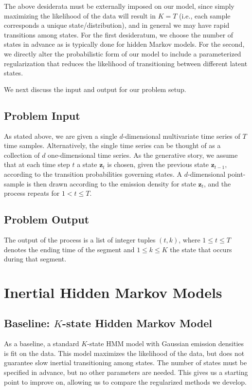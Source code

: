 \documentclass[12pt]{article}
\begin{document}
The above desiderata must be externally imposed on our model, since simply maximizing the likelihood of the data will result in $K = T$ (i.e., each sample corresponds a unique state/distribution), and in general we may have rapid transitions among states. For the first desideratum,  we choose the number of states in advance as is typically done for hidden Markov models. For the second, we directly alter the probabilistic form of our model to include a parameterized regularization that reduces the likelihood of transitioning between different latent states.

We next discuss the input and output for our problem setup.

\subsection{Problem Input}

As stated above, we are given a single $d$-dimensional multivariate time series of $T$ time samples. Alternatively, the single time series can be thought of as a collection of $d$ one-dimensional time series. As the generative story, we assume that at each time step $t$ a state $\mathbf{z}_t$ is chosen, given the previous state $\mathbf{z}_{t-1}$, according to the transition probabilities governing states. A $d$-dimensional point-sample is then drawn according to the emission density for state $\mathbf{z}_t$, and the process repeats for $1 < t \leq T$.

\subsection{Problem Output}

The output of the process is a list of integer tuples $(t, k)$, where $1 \leq t \leq T$ denotes the ending time of the segment and $1 \leq k \leq K$ the state that occurs during that segment. 

\section{Inertial Hidden Markov Models}

\subsection{Baseline: $K$-state Hidden Markov Model}

As a baseline, a standard $K$-state HMM model with Gaussian emission densities is fit on the data. This model maximizes the likelihood of the data, but does not guarantee slow inertial transitioning among states. The number of states must be specified in advance, but no other parameters are needed. This gives us a starting point to improve on, allowing us to compare the regularized methods we develop.
\end{document}
